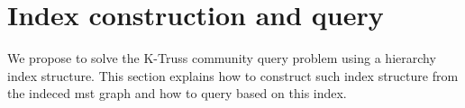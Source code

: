 \section{Index construction and query}
\label{index}

We propose to solve the K-Truss community query problem using a hierarchy index structure. This section explains how to construct such index structure from the indeced mst graph and how to query based on this index.

